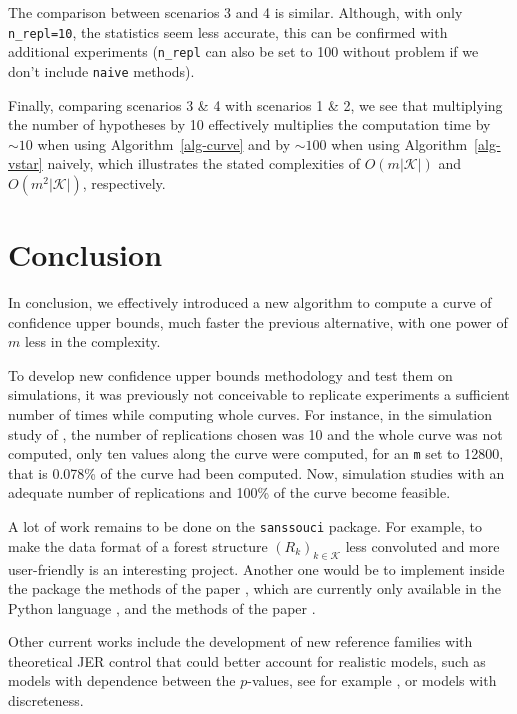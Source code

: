 \documentclass[
  11pt,
  a4paper,
]{article}
\theoremstyle{definition}
\theoremstyle{plain}
\theoremstyle{plain}
\theoremstyle{plain}
\theoremstyle{definition}
\theoremstyle{remark}
\begin{document}
The comparison between scenarios 3 and 4 is similar. Although, with only
\texttt{n\_repl=10}, the statistics seem less accurate, this can be
confirmed with additional experiments (\texttt{n\_repl} can also be set
to 100 without problem if we don't include \texttt{naive} methods).

Finally, comparing scenarios 3 \& 4 with scenarios 1 \& 2, we see that
multiplying the number of hypotheses by 10 effectively multiplies the
computation time by \(\sim10\) when using  Algorithm~\ref{alg-curve} 
and by \(\sim100\) when using  Algorithm~\ref{alg-vstar}  naively, which
illustrates the stated complexities of \(O(m|\mathcal{K}|)\) and
\(O(m^2|\mathcal{K}|)\), respectively.

\section{Conclusion}\label{sec-conclusion}

In conclusion, we effectively introduced a new algorithm to compute a
curve of confidence upper bounds, much faster the previous alternative,
with one power of \(m\) less in the complexity.

To develop new confidence upper bounds methodology and test them on
simulations, it was previously not conceivable to replicate experiments
a sufficient number of times while computing whole curves. For instance,
in the simulation study of \citet{MR4178188}, the number of replications
chosen was 10 and the whole curve was not computed, only ten values
along the curve were computed, for an \texttt{m} set to 12800, that is
0.078\% of the curve had been computed. Now, simulation studies with an
adequate number of replications and 100\% of the curve become feasible.

A lot of work remains to be done on the \texttt{sanssouci} package. For
example, to make the data format of a forest structure
\((R_k)_{k\in\mathcal{K}}\) less convoluted and more user-friendly is an
interesting project. Another one would be to implement inside the
package the methods of the paper \citet{blain22notip}, which are
currently only available in the Python language \citep{10.5555/1593511},
and the methods of the paper \citet{JMLR:v25:23-1025}.

Other current works include the development of new reference families
with theoretical JER control that could better account for realistic
models, such as models with dependence between the \(p\)-values, see for
example \citet{perrot2023selective}, or models with discreteness.
\end{document}
